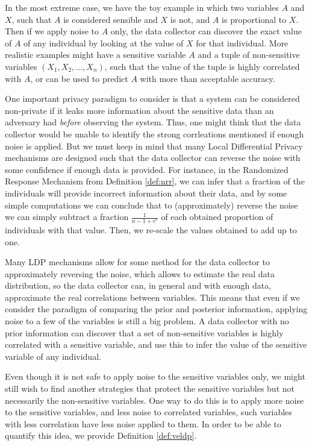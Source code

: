 \documentclass[conference]{IEEEtran}
\begin{document}
In the most extreme case, we have the toy example in which two variables $A$ and $X$, such that $A$ is considered sensible and $X$ is not, and $A$ is proportional to $X$. Then if we apply noise to $A$ only, the data collector can discover the exact value of $A$ of any individual by looking at the value of $X$ for that individual. More realistic examples might have a sensitive variable $A$ and a tuple of non-sensitive variables $(X_1,X_2,...,X_n)$, such that the value of the tuple is highly correlated with $A$, or can be used to predict $A$ with more than acceptable accuracy.

One important privacy paradigm to consider is that a system can be considered non-private if it leaks more information about the sensitive data than an adversary had \emph{before} observing the system. Thus, one might think that the data collector would be unable to identify the strong corrleations mentioned if enough noise is applied. But we must keep in mind that many Local Differential Privacy mechanisms are designed such that the data collector can reverse the noise with some confidence if enough data is provided. For instance, in the Randomized Response Mechanism from Definition \ref{def:nrr}, we can infer that a fraction of the individuals will provide incorrect information about their data, and by some simple computations we can conclude that to (approximately) reverse the noise we can simply subtract a fraction $\frac{1}{n-1+e^\epsilon}$ of each obtained proportion of individuals with that value. Then, we re-scale the values obtained to add up to one.

Many LDP mechanisms allow for some method for the data collector to approximately reversing the noise, which allows to estimate the real data distribution, so the data collector can, in general and with enough data, approximate the real correlations between variables. This means that even if we consider the paradigm of comparing the prior and posterior information, applying noise to a few of the variables is still a big problem. A data collector with no prior information can discover that a set of non-sensitive variables is highly correlated with a sensitive variable, and use this to infer the value of the sensitive variable of any individual.

Even though it is not safe to apply noise to the sensitive variables only, we might still wish to find another strategies that protect the sensitive variables but not necessarily the non-sensitive variables. One way to do this is to apply more noise to the sensitive variables, and less noise to correlated variables, such variables with less correlation have less noise applied to them. In order to be able to quantify this idea, we provide Definition \ref{def:veldp}.
\end{document}
